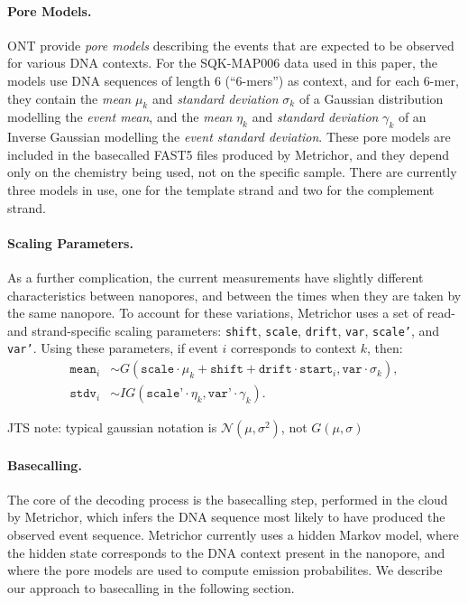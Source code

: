 \documentclass{bioinfo}
\begin{document}
\paragraph{Pore Models.}

ONT provide \emph{pore models} describing the events that are expected to be observed for various DNA contexts. For the SQK-MAP006 data used in this paper, the models use DNA sequences of length 6 (``6-mers'') as context, and for each 6-mer, they contain the \emph{mean} $\mu_k$ and \emph{standard deviation} $\sigma_k$ of a Gaussian distribution modelling the \emph{event mean}, and the \emph{mean} $\eta_k$ and \emph{standard deviation} $\gamma_k$ of an Inverse Gaussian modelling the \emph{event standard deviation}. These pore models are included in the basecalled FAST5 files produced by Metrichor, and they depend only on the chemistry being used, not on the specific sample. There are currently three models in use, one for the template strand and two for the complement strand.

\paragraph{Scaling Parameters.}
As a further complication, the current measurements have slightly different characteristics between nanopores, and between the times when they are taken by the same nanopore. To account for these variations, Metrichor uses a set of read- and strand-specific scaling parameters: \texttt{shift}, \texttt{scale}, \texttt{drift}, \texttt{var}, \texttt{scale'}, and \texttt{var'}. Using these parameters, if event $i$ corresponds to context $k$, then:
\begin{align*}
\texttt{mean}_i & \sim
G(\texttt{scale} \cdot \mu_k + \texttt{shift} + \texttt{drift} \cdot \texttt{start}_i,
\texttt{var} \cdot \sigma_k), \\
\texttt{stdv}_i & \sim
IG(\texttt{scale'} \cdot \eta_k,
\texttt{var'} \cdot \gamma_k).
\end{align*}

JTS note: typical gaussian notation is $\mathcal{N}(\mu, \sigma^2)$, not $G(\mu, \sigma)$

\paragraph{Basecalling.}

The core of the decoding process is the basecalling step, performed in the cloud by Metrichor, which infers the DNA sequence most likely to have produced the observed event sequence. Metrichor currently uses a hidden Markov model, where the hidden state corresponds to the DNA context present in the nanopore, and where the pore models are used to compute emission probabilites. We describe our approach to basecalling in the following section.
\end{document}
